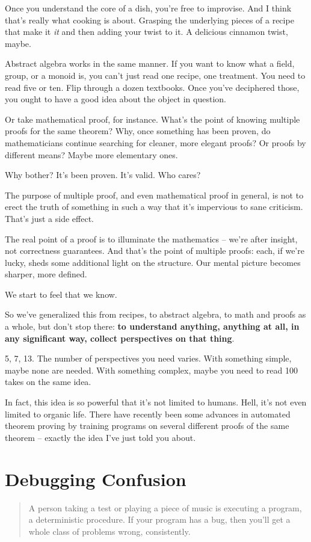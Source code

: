Once you understand the core of a dish, you're free to improvise. And I think
that's really what cooking is about. Grasping the underlying pieces of a recipe
that make it \textit{it} and then adding your twist to it. A delicious cinnamon
twist, maybe.

Abstract algebra works in the same manner. If you want to know what a field,
group, or a monoid is, you can't just read one recipe, one treatment. You need
to read five or ten. Flip through a dozen textbooks. Once you've deciphered those, you ought to have a good
idea about the object in question.

Or take mathematical proof, for instance. What's the point of knowing multiple
proofs for the same theorem? Why, once something has been proven, do
mathematicians continue searching for cleaner, more elegant proofs? Or proofs by
different means? Maybe more elementary ones.

Why bother? It's been proven. It's valid. Who cares?

The purpose of multiple proof, and even mathematical proof in general, is not to
erect the truth of something in such a way that it's impervious to sane
criticism. That's just a side effect.

The real point of a proof is to illuminate the mathematics -- we're after
insight, not correctness guarantees. And that's the point of multiple proofs:
each, if we're lucky, sheds some additional light on the structure. Our mental
picture becomes sharper, more defined.

We start to feel that we know.

So we've generalized this from recipes, to abstract algebra, to math and proofs
as a whole, but don't stop there: \textbf{to understand anything, anything at all, in
  any significant way, collect perspectives on that thing}.

5, 7, 13. The number of perspectives you need varies. With something simple,
maybe none are needed. With something complex, maybe you need to read 100 takes
on the same idea.

In fact, this idea is so powerful that it's not limited to humans. Hell, it's
not even limited to organic life. There have recently been some advances in
automated theorem proving by training programs on several different proofs of
the same theorem -- exactly the idea I've just told you about.


\section{Debugging Confusion}
\begin{quote}
A person taking a test or playing a piece of music is executing a program, a
deterministic procedure.  If your program has a bug, then you'll get a whole
class of problems wrong, consistently.
\end{quote}

